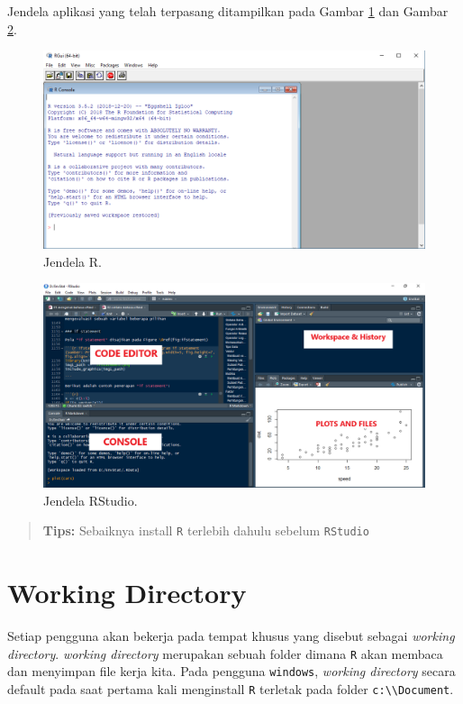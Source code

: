 \documentclass[
]{book}
\theoremstyle{definition}
\theoremstyle{definition}
\theoremstyle{definition}
\theoremstyle{definition}
\theoremstyle{remark}
\begin{document}
Jendela aplikasi yang telah terpasang ditampilkan pada Gambar \ref{fig:jendela-R} dan Gambar \ref{fig:jendela-RStudio}.

\begin{figure}

{\centering \includegraphics[width=0.8\linewidth]{./images/jendela_r} 

}

\caption{Jendela R.}\label{fig:jendela-R}
\end{figure}

\begin{figure}

{\centering \includegraphics[width=0.8\linewidth]{./images/jendela_rstudio} 

}

\caption{Jendela RStudio.}\label{fig:jendela-RStudio}
\end{figure}

\begin{quote}
\textbf{Tips:} Sebaiknya install \texttt{R} terlebih dahulu sebelum \texttt{RStudio}
\end{quote}

\hypertarget{wdR}{%
\section{Working Directory}\label{wdR}}

Setiap pengguna akan bekerja pada tempat khusus yang disebut sebagai \emph{working directory}. \emph{working directory} merupakan sebuah folder dimana \texttt{R} akan membaca dan menyimpan file kerja kita. Pada pengguna \texttt{windows}, \emph{working directory} secara default pada saat pertama kali menginstall \texttt{R} terletak pada folder \texttt{c:\textbackslash{}\textbackslash{}Document}.
\end{document}
